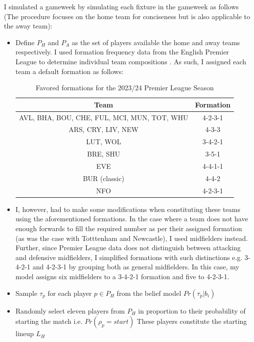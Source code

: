 I simulated a gameweek by simulating each fixture in the gameweek as follows (The procedure focuses on the home team for conciseness but is also applicable to the away team):
\begin{itemize}
    \item Define $P_H$ and $P_A$ as the set of players available the home and away teams respectively. I used formation frequency data from the English Premier League to determine individual team compositions \cite{clarke2024}. As such, I assigned each team a default formation as follows:
    \begin{table}[h!]
        \centering
        \begin{tabular}{|c|c|}
            \hline
            Team & Formation \\ \hline
            AVL, BHA, BOU, CHE, FUL, MCI, MUN, TOT, WHU & 4-2-3-1    \\ \hline
            ARS, CRY, LIV, NEW & 4-3-3  \\ \hline
            LUT, WOL & 3-4-2-1 \\ \hline
            BRE, SHU & 3-5-1 \\ \hline
            EVE & 4-4-1-1 \\ \hline
            BUR (classic) & 4-4-2 \\ \hline
            NFO & 4-2-3-1 \\ \hline
        \end{tabular}
        \caption{Favored formations for the 2023/24 Premier League Season}
        \label{tab:fomation_table}
    \end{table}
    \item I, however, had to make some modifications when constituting these teams using the aforementioned formations. In the case where a team does not have enough forwards to fill the required number as per their assigned formation (as was the case with Totttenham and Newcastle), I used midfielders instead. Further, since Premier League data does not distinguish between attacking and defensive midfielders, I simplified formations with such distinctions e.g. 3-4-2-1 and 4-2-3-1 by grouping both as general midfielders. In this case, my model assigns six midfielders to a 3-4-2-1 formation and five to 4-2-3-1.
    \item Sample $\tau_p$ for each player $p \in P_H$  from the belief model $Pr(\tau_p | b_i)$
    \item Randomly select eleven players from $P_H$ in proportion to their probability of starting the match i.e. $Pr(\rho_p = start)$ These players constitute the starting lineup $L_H$

\end{itemize}
